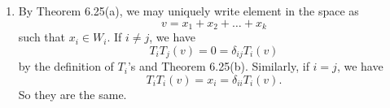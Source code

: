 \begin{enumerate}
\item By Theorem 6.25(a), we may uniquely write element in the space as 
\[v=x_1+x_2+\ldots +x_k\]
such that $x_i\in W_i$. If $i\neq j$, we have 
\[T_iT_j(v)=0=\delta_{ij}T_i(v)\]
by the definition of $T_i$'s and Theorem 6.25(b). Similarly, if $i=j$, we have 
\[T_iT_i(v)=x_i=\delta_{ii}T_i(v).\]
So they are the same.
\end{enumerate}

